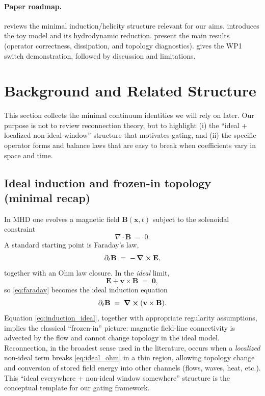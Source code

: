 \documentclass[11pt]{article}
\theoremstyle{plain}
\theoremstyle{definition}
\theoremstyle{remark}
\newcommand{\diver}{\nabla\cdot}
\newcommand{\B}{\mathbf{B}}
\newcommand{\E}{\mathbf{E}}
\newcommand{\vfield}{\mathbf{v}}
\begin{document}
\paragraph{Paper roadmap.}
 reviews the minimal induction/helicity structure relevant for our aims.
 introduces the toy model and its hydrodynamic reduction.
 present the main results (operator correctness, dissipation, and topology diagnostics).
 gives the WP1 switch demonstration, followed by discussion and limitations.

\section{Background and Related Structure}\label{sec:background}

This section collects the minimal continuum identities we will rely on later. Our purpose is not to
review reconnection theory, but to highlight (i) the ``ideal + localized non-ideal window'' structure
that motivates gating, and (ii) the specific operator forms and balance laws that are easy to break when
coefficients vary in space and time.

\subsection{Ideal induction and frozen-in topology (minimal recap)}\label{sec:background_ideal}
In MHD one evolves a magnetic field $\B(\mathbf{x},t)$ subject to the solenoidal constraint
\begin{equation}\label{eq:divB_zero}
  \diver \B \;=\; 0.
\end{equation}
A standard starting point is Faraday's law,
\begin{equation}\label{eq:faraday}
  \partial_t \B \;=\; -\,\curl \E,
\end{equation}
together with an Ohm law closure. In the \emph{ideal} limit,
\begin{equation}\label{eq:ideal_ohm}
  \E + \vfield\times\B \;=\; \mathbf{0},
\end{equation}
so \eqref{eq:faraday} becomes the ideal induction equation
\begin{equation}\label{eq:induction_ideal}
  \partial_t \B \;=\; \curl(\vfield\times\B).
\end{equation}
Equation \eqref{eq:induction_ideal}, together with appropriate regularity assumptions, implies the
classical ``frozen-in'' picture: magnetic field-line connectivity is advected by the flow and cannot
change topology in the ideal model. Reconnection, in the broadest sense used in the literature, occurs
when a \emph{localized} non-ideal term breaks \eqref{eq:ideal_ohm} in a thin region, allowing topology
change and conversion of stored field energy into other channels (flows, waves, heat, etc.). This
``ideal everywhere + non-ideal window somewhere'' structure is the conceptual template for our gating
framework.
\end{document}
